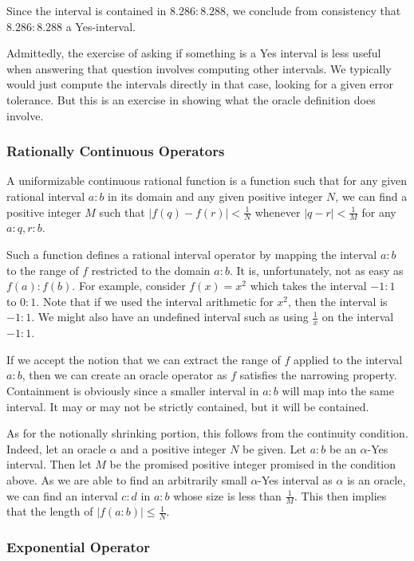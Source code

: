 \documentclass[12pt]{article}
\begin{document}
Since the interval is contained in $8.286:8.288$, we conclude from consistency that $8.286:8.288$ a Yes-interval. 

Admittedly, the exercise of asking if something is a Yes interval is less useful when answering that question involves computing other intervals. We typically would just compute the intervals directly in that case, looking for a given error tolerance. But this is an exercise in showing what the oracle definition does involve.

\subsubsection{Rationally Continuous Operators}

A uniformizable continuous rational function is a function such that for any given rational interval $a:b$ in its domain and any given positive integer $N$, we can find a positive integer $M$ such that $|f(q) - f(r)| < \frac{1}{N} $ whenever $|q-r| < \frac{1}{M}$ for any $a:q,r:b$. 

Such a function defines a rational interval operator by mapping the interval $a:b$ to the range of $f$ restricted to the domain $a:b$. It is, unfortunately, not as easy as $f(a):f(b)$. For example, consider $f(x) = x^2$ which takes the interval $-1:1$ to $0:1$. Note that if we used the interval arithmetic for $x^2$, then the interval is $-1:1$. We might also have an undefined interval such as using $\frac{1}{x}$ on the interval $-1:1$.

If we accept the notion that we can extract the range of $f$ applied to the interval $a:b$, then we can create an oracle operator as $f$ satisfies the narrowing property. Containment is obviously since a smaller interval in $a:b$ will map into the same interval. It may or may not be strictly contained, but it will be contained. 


As for the notionally shrinking portion, this follows from the continuity condition. Indeed, let an oracle $\alpha$ and a positive integer $N$ be given. Let $a:b$ be an $\alpha$-Yes interval. Then let $M$ be the promised positive integer promised in the condition above. As we are able to find an arbitrarily small $\alpha$-Yes interval as $\alpha$ is an oracle, we can find an interval $c:d$ in $a:b$ whose size is less than $\frac{1}{M}$. This then implies that the length of $|f(a:b)| \leq \frac{1}{N}$.

\subsubsection{Exponential Operator}
\end{document}
